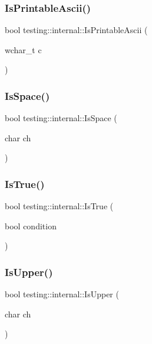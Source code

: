\subsubsection{\texorpdfstring{IsPrintableAscii()}{IsPrintableAscii()}}
{\footnotesize\ttfamily bool testing\+::internal\+::\+Is\+Printable\+Ascii (\begin{DoxyParamCaption}\item[{wchar\+\_\+t}]{c }\end{DoxyParamCaption})\hspace{0.3cm}{\ttfamily [inline]}}

\mbox{\label{namespacetesting_1_1internal_af429e04f70f9c10f6aa76a5d1ccd389f}} 
\subsubsection{\texorpdfstring{IsSpace()}{IsSpace()}}
{\footnotesize\ttfamily bool testing\+::internal\+::\+Is\+Space (\begin{DoxyParamCaption}\item[{char}]{ch }\end{DoxyParamCaption})\hspace{0.3cm}{\ttfamily [inline]}}

\mbox{\label{namespacetesting_1_1internal_a527b9bcc13669b9a16400c8514266254}} 
\subsubsection{\texorpdfstring{IsTrue()}{IsTrue()}}
{\footnotesize\ttfamily bool testing\+::internal\+::\+Is\+True (\begin{DoxyParamCaption}\item[{bool}]{condition }\end{DoxyParamCaption})}

\mbox{\label{namespacetesting_1_1internal_a84f3baa379fec6bf5947cb5165aa8cc9}} 
\subsubsection{\texorpdfstring{IsUpper()}{IsUpper()}}
{\footnotesize\ttfamily bool testing\+::internal\+::\+Is\+Upper (\begin{DoxyParamCaption}\item[{char}]{ch }\end{DoxyParamCaption})\hspace{0.3cm}{\ttfamily [inline]}}

